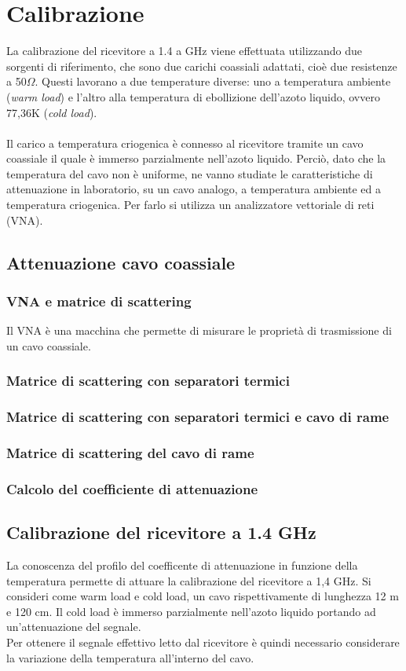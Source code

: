 \section{Calibrazione}
La calibrazione del ricevitore a 1.4 a GHz viene effettuata utilizzando due sorgenti di riferimento, che sono due carichi coassiali adattati, cioè due resistenze a 50$\Omega$. Questi lavorano a due temperature diverse: uno a temperatura ambiente (\textit{warm load}) e l'altro alla temperatura di ebollizione dell'azoto liquido, ovvero 77,36K (\textit{cold load}). \\\\Il carico a temperatura criogenica è connesso al ricevitore tramite un cavo coassiale il quale è immerso parzialmente nell'azoto liquido. Perciò, dato che la temperatura del cavo non è uniforme, ne vanno studiate le caratteristiche di attenuazione in laboratorio, su un cavo analogo, a temperatura ambiente ed a temperatura criogenica. Per farlo si utilizza un analizzatore vettoriale di reti (VNA).

\subsection{Attenuazione cavo coassiale}
\subsubsection{VNA e matrice di scattering}
Il VNA è una macchina che permette di misurare le proprietà di trasmissione di un cavo coassiale.
\subsubsection{Matrice di scattering con separatori termici}
\subsubsection{Matrice di scattering con separatori termici e cavo di rame}
\subsubsection{Matrice di scattering del cavo di rame}
\subsubsection{Calcolo del coefficiente di attenuazione}


\subsection{Calibrazione del ricevitore a 1.4 GHz}
La conoscenza del profilo del coefficente di attenuazione in funzione della temperatura permette di attuare la calibrazione del ricevitore a 1,4 GHz. Si consideri come warm load e cold load, un cavo rispettivamente di lunghezza 12 m e 120 cm. Il cold load è immerso parzialmente nell'azoto liquido portando ad un'attenuazione del segnale.\\
Per ottenere il segnale effettivo letto dal ricevitore è quindi necessario considerare la variazione della temperatura all'interno del cavo.

